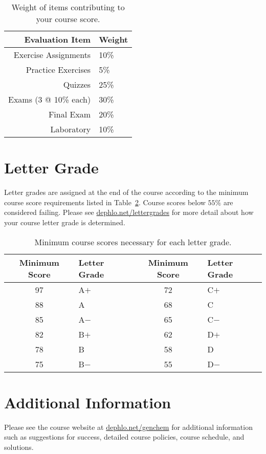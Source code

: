 \documentclass[letterpaper,oneside,onecolumn,11pt,article]{memoir}
\begin{document}
\begin{table}[h]
\caption{\sffamily Weight of items contributing to your course score.}
\label{tab:weights}
\begin{tabular}{r|l} \toprule
\textbf{Evaluation Item} & \textbf{Weight} \\ \hline
Exercise Assignments & 10\% \\
Practice Exercises & 5\% \\
Quizzes & 25\% \\
Exams (3 @ 10\% each) & 30\% \\
Final Exam & 20\% \\
Laboratory & 10\% \\ 
\bottomrule
\end{tabular}
\end{table}

\section{Letter Grade}
Letter grades are assigned at the end of the course according to the minimum course score requirements listed in Table~\ref{tab:lettergrades}. Course scores below $55\%$ are considered failing. Please see \href{http://dephlo.net/lettergrades}{dephlo.net/lettergrades} for more detail about how your course letter grade is determined. 

\begin{table}[h]
\caption{\sffamily Minimum course scores necessary for each letter grade.}
\label{tab:lettergrades}
\begin{tabular}{cl||cl} \toprule
\textbf{Minimum Score} & \textbf{Letter Grade} & \textbf{Minimum Score} & \textbf{Letter Grade} \\ \hline
97 & \hspace{0.3in}A$+$ & 72 & \hspace{0.3in}C$+$ \\
88 & \hspace{0.3in}A & 68 & \hspace{0.3in}C \\
85 & \hspace{0.3in}A$-$ & 65 & \hspace{0.3in}C$-$ \\
82 & \hspace{0.3in}B$+$ & 62 & \hspace{0.3in}D$+$ \\
78 & \hspace{0.3in}B & 58 & \hspace{0.3in}D \\
75 & \hspace{0.3in}B$-$ & 55 & \hspace{0.3in}D$-$ \\
\bottomrule
\end{tabular}
\end{table}

\section{Additional Information}

Please see the course website at \href{http://dephlo.net/genchem}{dephlo.net/genchem} for additional information such as suggestions for success, detailed course policies, course schedule, and solutions. 
\end{document}
